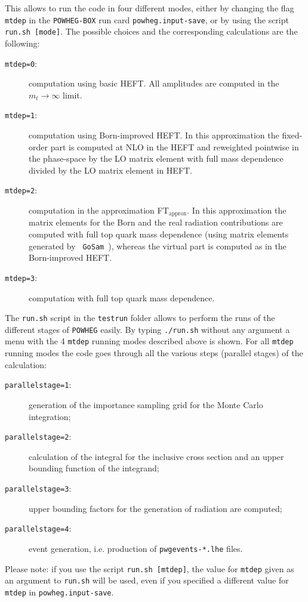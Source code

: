 \documentclass[paper]{JHEP3}
\newcommand\POWHEG{{\tt POWHEG}}
\newcommand\POWHEGBOX{{\tt POWHEG-BOX}}
\newcommand\ftapprox{FT$_{\mathrm{approx}}$\xspace}
\begin{document}
This allows to run the code in four different modes, either by
changing the flag {\tt mtdep} in the \POWHEGBOX{} run card {\tt powheg.input-save}, or by using the script {\tt run.sh [mode]}.
The possible choices and the corresponding calculations are the following:
\begin{description}
 \item[{\tt mtdep=0}:]{computation using basic HEFT. All amplitudes
   are computed in the $m_t\to\infty$ limit.}
 \item[{\tt mtdep=1}:]{computation using Born-improved HEFT. In this
   approximation the fixed-order part is computed at NLO in the HEFT
   and reweighted pointwise in the phase-space by the LO matrix
   element with full mass dependence divided by the LO matrix
   element in HEFT.}
 \item[{\tt mtdep=2}:]{computation in the approximation \ftapprox. In
   this approximation the matrix elements for the Born and the real
   radiation contributions are computed with full top quark mass dependence
   (using matrix elements generated by {\tt
     GoSam}~\cite{Cullen:2014yla}), whereas the virtual part is
   computed as in the Born-improved HEFT. }
 \item[{\tt mtdep=3}:]{computation with full top quark mass dependence.}
\end{description}

The {\tt run.sh} script in the {\tt testrun} folder allows to perform 
the runs of the different stages of \POWHEG{} easily.
By typing {\tt ./run.sh} without any argument a menu with the
4 {\tt mtdep} running modes described above is shown. 
For all {\tt mtdep} running modes the code goes through all
the various steps (parallel stages) of the calculation: 
\begin{description}
 \item[{\tt parallelstage=1}:]
generation of the importance sampling grid for the Monte Carlo integration; 
 \item[{\tt parallelstage=2}:] calculation of the integral for the inclusive cross section and an upper bounding function of the integrand;
 \item[{\tt parallelstage=3}:] upper bounding factors for the generation of radiation are computed;
 \item[{\tt parallelstage=4}:] event generation, i.e. production of {\tt pwgevents-*.lhe} files.
\end{description}

\noindent Please note: if you use the script {\tt run.sh [mtdep]}, the value for {\tt mtdep} given as an argument to {\tt run.sh} will be used, even if you specified a different value for {\tt mtdep} in {\tt powheg.input-save}.
\end{document}
